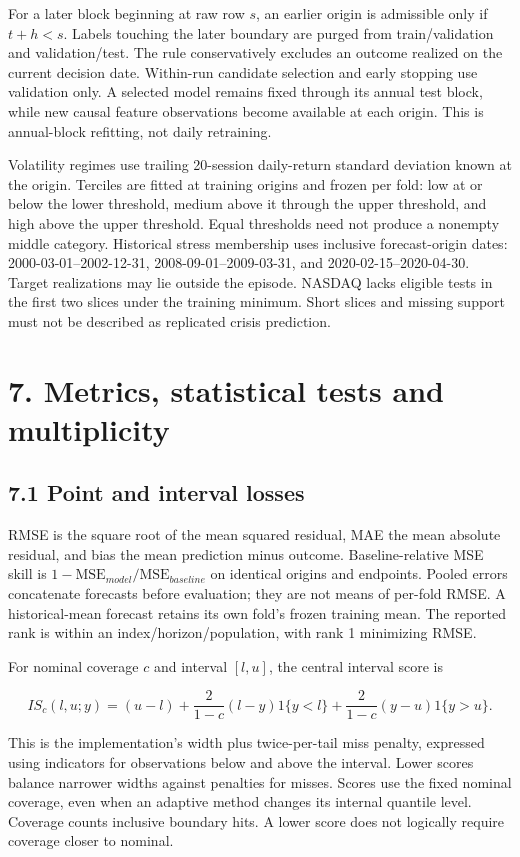 \documentclass[11pt]{article}
\begin{document}
For a later block beginning at raw row $s$, an earlier origin is admissible only if $t+h<s$. Labels touching the later boundary are purged from train/validation and validation/test. The rule conservatively excludes an outcome realized on the current decision date. Within-run candidate selection and early stopping use validation only. A selected model remains fixed through its annual test block, while new causal feature observations become available at each origin. This is annual-block refitting, not daily retraining.

Volatility regimes use trailing 20-session daily-return standard deviation known at the origin. Terciles are fitted at training origins and frozen per fold: low at or below the lower threshold, medium above it through the upper threshold, and high above the upper threshold. Equal thresholds need not produce a nonempty middle category. Historical stress membership uses inclusive forecast-origin dates: 2000-03-01--2002-12-31, 2008-09-01--2009-03-31, and 2020-02-15--2020-04-30. Target realizations may lie outside the episode. NASDAQ lacks eligible tests in the first two slices under the training minimum. Short slices and missing support must not be described as replicated crisis prediction.

\section*{7. Metrics, statistical tests and multiplicity}

\subsection*{7.1 Point and interval losses}

RMSE is the square root of the mean squared residual, MAE the mean absolute residual, and bias the mean prediction minus outcome. Baseline-relative MSE skill is $1-\mathrm{MSE}_{model}/\mathrm{MSE}_{baseline}$ on identical origins and endpoints. Pooled errors concatenate forecasts before evaluation; they are not means of per-fold RMSE. A historical-mean forecast retains its own fold's frozen training mean. The reported rank is within an index/horizon/population, with rank 1 minimizing RMSE.

For nominal coverage $c$ and interval $[l,u]$, the central interval score is

\[
IS_c(l,u;y)=(u-l)+\frac{2}{1-c}(l-y)1\{y<l\}+\frac{2}{1-c}(y-u)1\{y>u\}.
\]

This is the implementation's width plus twice-per-tail miss penalty, expressed using indicators for observations below and above the interval. Lower scores balance narrower widths against penalties for misses. Scores use the fixed nominal coverage, even when an adaptive method changes its internal quantile level. Coverage counts inclusive boundary hits. A lower score does not logically require coverage closer to nominal.
\end{document}
